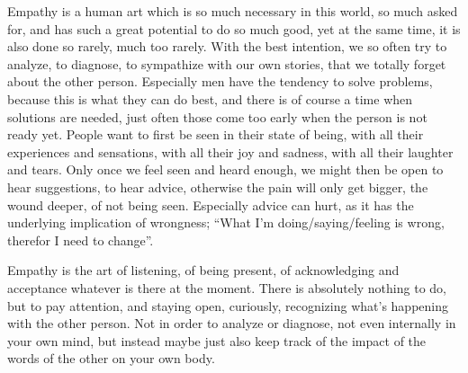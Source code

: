 Empathy is a human art which is so much necessary in this world, so much asked for, and has such a great potential to do so much good, yet at the same time, it is also done so rarely, much too rarely.
With the best intention, we so often try to analyze, to diagnose, to sympathize with our own stories, that we totally forget about the other person.
Especially men have the tendency to solve problems, because this is what they can do best, and there is of course a time when solutions are needed, just often those come too early when the person is not ready yet.
People want to first be seen in their state of being, with all their experiences and sensations, with all their joy and sadness, with all their laughter and tears.
Only once we feel seen and heard enough, we might then be open to hear suggestions, to hear advice, otherwise the pain will only get bigger, the wound deeper, of not being seen.
Especially advice can hurt, as it has the underlying implication of wrongness; ``What I'm doing/saying/feeling is wrong, therefor I need to change''.



Empathy is the art of listening, of being present, of acknowledging and acceptance whatever is there at the moment.
There is absolutely nothing to do, but to pay attention, and staying open, curiously, recognizing what's happening with the other person.
Not in order to analyze or diagnose, not even internally in your own mind, but instead maybe just also keep track of the impact of the words of the other on your own body.

